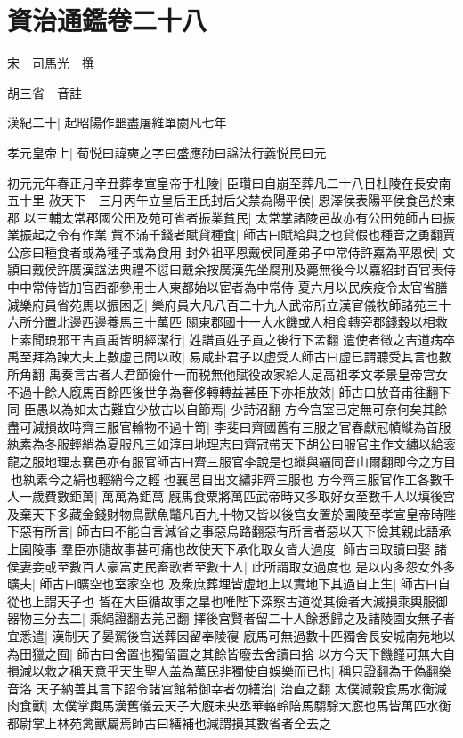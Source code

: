 \chapter{資治通鑑卷二十八}
宋　司馬光　撰

胡三省　音註

漢紀二十|{
	起昭陽作噩盡屠維單閼凡七年}


孝元皇帝上|{
	荀悦曰諱奭之字曰盛應劭曰諡法行義悦民曰元}


初元元年春正月辛丑葬孝宣皇帝于杜陵|{
	臣瓚曰自崩至葬凡二十八日杜陵在長安南五十里}
赦天下　三月丙午立皇后王氏封后父禁為陽平侯|{
	恩澤侯表陽平侯食邑於東郡}
以三輔太常郡國公田及苑可省者振業貧民|{
	太常掌諸陵邑故亦有公田苑師古曰振業振起之令有作業}
貲不滿千錢者賦貸種食|{
	師古曰賦給與之也貸假也種音之勇翻賈公彦曰種食者或為種子或為食用}
封外祖平恩戴侯同產弟子中常侍許嘉為平恩侯|{
	文頴曰戴侯許廣漢諡法典禮不愆曰戴余按廣漢先坐腐刑及薨無後今以嘉紹封百官表侍中中常侍皆加官西都參用士人東都始以宦者為中常侍}
夏六月以民疾疫令太官省膳減樂府員省苑馬以振困乏|{
	樂府員大凡八百二十九人武帝所立漢官儀牧師諸苑三十六所分置北邊西邊養馬三十萬匹}
關東郡國十一大水饑或人相食轉旁郡錢穀以相救　上素聞琅邪王吉貢禹皆明經潔行|{
	姓譜貢姓子貢之後行下孟翻}
遣使者徵之吉道病卒禹至拜為諫大夫上數虛己問以政|{
	易咸卦君子以虚受人師古曰虛已謂聽受其言也數所角翻}
禹奏言古者人君節儉什一而税無他賦役故家給人足高祖孝文孝景皇帝宫女不過十餘人廐馬百餘匹後世争為奢侈轉轉益甚臣下亦相放效|{
	師古曰放音甫往翻下同}
臣愚以為如太古難宜少放古以自節焉|{
	少詩沼翻}
方今宫室已定無可奈何矣其餘盡可減損故時齊三服官輸物不過十笥|{
	李斐曰齊國舊有三服之官春獻冠幘縰為首服紈素為冬服輕綃為夏服凡三如淳曰地理志曰齊冠帶天下胡公曰服官主作文繡以給衮龍之服地理志襄邑亦有服官師古曰齊三服官李說是也縰與纚同音山爾翻即今之方目也紈素今之絹也輕綃今之輕也襄邑自出文繡非齊三服也}
方今齊三服官作工各數千人一歲費數鉅萬|{
	萬萬為鉅萬}
廐馬食粟將萬匹武帝時又多取好女至數千人以填後宫及棄天下多藏金錢財物鳥獸魚鼈凡百九十物又皆以後宫女置於園陵至孝宣皇帝時陛下惡有所言|{
	師古曰不能自言減省之事惡烏路翻惡有所言者惡以天下儉其親此語承上園陵事}
羣臣亦隨故事甚可痛也故使天下承化取女皆大過度|{
	師古曰取讀曰娶}
諸侯妻妾或至數百人豪富吏民畜歌者至數十人|{
	此所謂取女過度也}
是以内多怨女外多曠夫|{
	師古曰曠空也室家空也}
及衆庶葬埋皆虛地上以實地下其過自上生|{
	師古曰自從也上謂天子也}
皆在大臣循故事之辠也唯陛下深察古道從其儉者大減損乘輿服御器物三分去二|{
	乘䋲證翻去羌呂翻}
擇後宫賢者留二十人餘悉歸之及諸陵園女無子者宜悉遣|{
	漢制天子晏駕後宫送葬因留奉陵寑}
廐馬可無過數十匹獨舍長安城南苑地以為田獵之囿|{
	師古曰舍置也獨留置之其餘皆廢去舍讀曰捨}
以方今天下饑饉可無大自損減以救之稱天意乎天生聖人盖為萬民非獨使自娛樂而已也|{
	稱只證翻為于偽翻樂音洛}
天子納善其言下詔令諸宫館希御幸者勿繕治|{
	治直之翻}
太僕減穀食馬水衡減肉食獸|{
	太僕掌輿馬漢舊儀云天子大廐未央丞華輅軨陪馬騶駼大廐也馬皆萬匹水衡都尉掌上林苑禽獸屬焉師古曰繕補也減謂損其數省者全去之}


